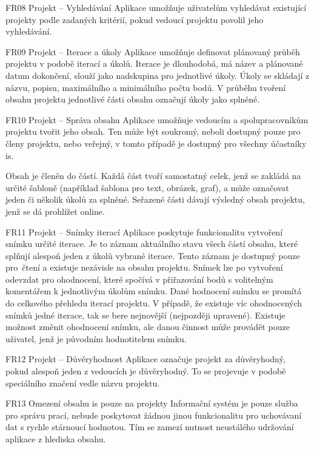 \begin{dl}
   \item[FR08 Projekt -- Vyhledávání]
   Aplikace umožňuje uživatelům vyhledávat existující projekty podle zadaných kritérií, pokud vedoucí projektu povolil jeho vyhledávání.

   \item[FR09 Projekt -- Iterace a úkoly]
   Aplikace umožňuje definovat plánovaný průběh projektu v podobě iterací a úkolů. Iterace je dlouhodobá, má název a plánované datum dokončení, slouží jako nadskupina pro jednotlivé úkoly. Úkoly se skládají z názvu, popisu, maximálního a minimálního počtu bodů. V průběhu tvoření obsahu projektu jednotlivé části obsahu označují úkoly jako splněné.

   \item[FR10 Projekt -- Správa obsahu]
   Aplikace umožňuje vedoucím a spolupracovníkům projektu tvořit jeho obsah. Ten může být soukromý, neboli dostupný pouze pro členy projektu, nebo veřejný, v tomto případě je dostupný pro všechny účastníky \gls{is}.

   Obsah je členěn do částí. Každá část tvoří samostatný celek, jenž se zakládá na určité šabloně (například šablona pro text, obrázek, graf), a může označovat jeden či několik úkolů za splněné. Seřazené části dávají výsledný obsah projektu, jenž se dá prohlížet online.

   \item[FR11 Projekt -- Snímky iterací]
   Aplikace poskytuje funkcionalitu vytvoření snímku určité iterace. Je to záznam aktuálního stavu všech částí obsahu, které splňují alespoň jeden z úkolů vybrané iterace. Tento záznam je dostupný pouze pro~čtení a existuje nezávisle na obsahu projektu. Snímek lze po vytvoření odevzdat pro ohodnocení, které spočívá v přiřazování bodů s volitelným komentářem k jednotlivým úkolům snímku. Dané hodnocení snímku se promítá do celkového přehledu iterací projektu. V případě, že existuje víc ohodnocených snímků jedné iterace, tak se bere nejnovější (nejpozději upravené). Existuje možnost změnit ohodnocení snímku, ale danou činnost může provádět pouze uživatel, jenž je původním hodnotitelem snímku.

   \item[FR12 Projekt -- Důvěryhodnost]
   Aplikace označuje projekt za důvěryhodný, pokud alespoň jeden z vedoucích je důvěryhodný. To se projevuje v podobě speciálního značení vedle názvu projektu.

   \item[FR13 Omezení obsahu \gls{is} pouze na projekty]
   Informační systém je pouze služba pro správu prací, nebude poskytovat žádnou jinou funkcionalitu pro uchovávaní dat s rychle stárnoucí hodnotou. Tím se zamezí nutnost neustálého udržování aplikace z hlediska obsahu.

\end{dl}



